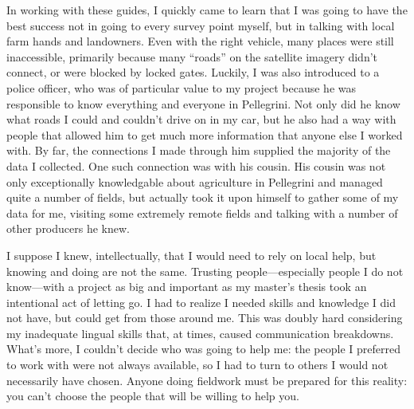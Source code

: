 In working with these guides, I quickly came to learn that I was going to have the best success not in going to every survey point myself, but in talking with local farm hands and landowners. Even with the right vehicle, many places were still inaccessible, primarily because many ``roads'' on the satellite imagery didn’t connect, or were blocked by locked gates. Luckily, I was also introduced to a police officer, who was of particular value to my project because he was responsible to know everything and everyone in Pellegrini. Not only did he know what roads I could and couldn’t drive on in my car, but he also had a way with people that allowed him to get much more information that anyone else I worked with. By far, the connections I made through him supplied the majority of the data I collected. One such connection was with his cousin. His cousin was not only exceptionally knowledgable about agriculture in Pellegrini and managed quite a number of fields, but actually took it upon himself to gather some of my data for me, visiting some extremely remote fields and talking with a number of other producers he knew.

I suppose I knew, intellectually, that I would need to rely on local help, but knowing and doing are not the same. Trusting people---especially people I do not know---with a project as big and important as my master’s thesis took an intentional act of letting go. I had to realize I needed skills and knowledge I did not have, but could get from those around me. This was doubly hard considering my inadequate lingual skills that, at times, caused communication breakdowns. What’s more, I couldn’t decide who was going to help me: the people I preferred to work with were not always available, so I had to turn to others I would not necessarily have chosen. Anyone doing fieldwork must be prepared for this reality: you can’t choose the people that will be willing to help you.

